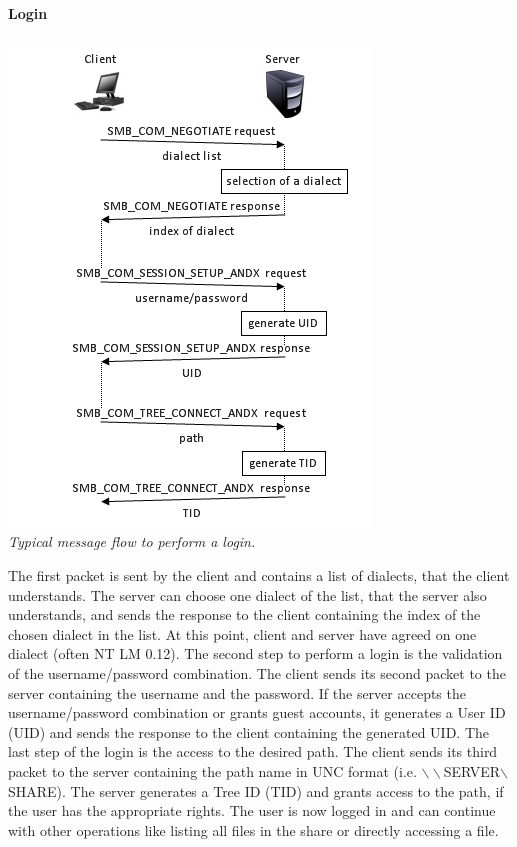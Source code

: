 \documentclass[11pt,a4paper]{book}
\begin{document}
\newpage

\paragraph{Login}
\begin{center}
\includegraphics{login.png} \\
\vspace{6pt}
\textit{Typical message flow to perform a login.}
\end{center}

The first packet is sent by the client and contains a list of dialects, that the client understands. The server can choose one dialect of the list, that the server also understands, and sends the response to the client containing the index of the chosen dialect in the list. At this point, client and server have agreed on one dialect (often NT LM 0.12). The second step to perform a login is the validation of the username/password combination. The client sends its second packet to the server containing the username and the password. If the server accepts the username/password combination or grants guest accounts, it generates a User ID (UID) and sends the response to the client containing the generated UID. The last step of the login is the access to the desired path. The client sends its third packet to the server containing the path name in UNC format (i.e. $\backslash\backslash$SERVER$\backslash$SHARE). The server generates a Tree ID (TID) and grants access to the path, if the user has the appropriate rights. The user is now logged in and can continue with other operations like listing all files in the share or directly accessing a file.
\end{document}
